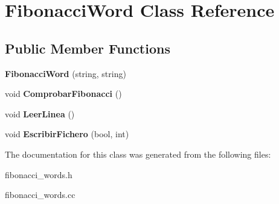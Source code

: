 \hypertarget{classFibonacciWord}{}\section{Fibonacci\+Word Class Reference}
\label{classFibonacciWord}
\subsection*{Public Member Functions}
\begin{DoxyCompactItemize}
\item 
\mbox{\label{classFibonacciWord_a5032e4c5d04fcd76639e678bc879cd15}} 
{\bfseries Fibonacci\+Word} (string, string)
\item 
\mbox{\label{classFibonacciWord_aa9fd22b37ccaba378efca063068da22e}} 
void {\bfseries Comprobar\+Fibonacci} ()
\item 
\mbox{\label{classFibonacciWord_a029d17ece88a8dcf2d9af38fe681616a}} 
void {\bfseries Leer\+Linea} ()
\item 
\mbox{\label{classFibonacciWord_a2cb4556f219953b48bd270e3c764bba4}} 
void {\bfseries Escribir\+Fichero} (bool, int)
\end{DoxyCompactItemize}


The documentation for this class was generated from the following files\+:\begin{DoxyCompactItemize}
\item 
fibonacci\+\_\+words.\+h\item 
fibonacci\+\_\+words.\+cc\end{DoxyCompactItemize}
